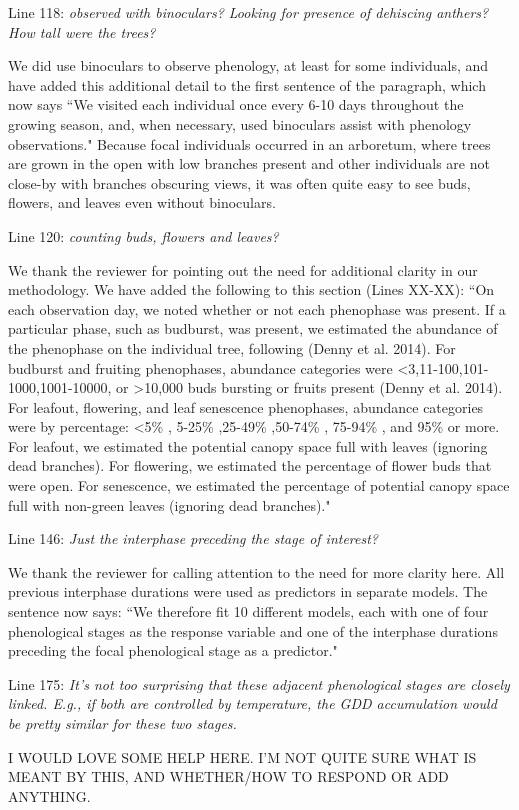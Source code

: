\documentclass[10.95pt,a4paper]{letter}
\begin{document}
\par Line 118: \emph{observed with binoculars?  Looking for presence of dehiscing anthers? How tall were the trees?}

\par We did use binoculars to observe phenology, at least for some individuals, and have added this additional detail to the first sentence  of the paragraph, which now says  ``We visited each individual once every 6-10 days throughout the growing season, and, when necessary, used binoculars assist with phenology observations." Because focal individuals occurred in an arboretum, where trees are grown in the open with low branches present and other individuals are not close-by with branches obscuring views,  it was often quite easy to see buds, flowers, and leaves even without binoculars. 

\par Line 120: \emph{counting buds, flowers and leaves?}

\par We thank the reviewer for pointing out the need for additional clarity in our methodology. We have added the following to this section (Lines XX-XX): ``On each observation day, we noted whether or not each phenophase was present. If a particular phase, such as budburst, was present, we estimated the abundance of the phenophase on the individual tree, following (Denny et al. 2014). For budburst and fruiting phenophases, abundance categories were \textless 3,11-100,101-1000,1001-10000, or \textgreater10,000 buds bursting or fruits present (Denny et al. 2014). For leafout, flowering, and leaf senescence phenophases, abundance categories were by percentage: \textless 5\% , 5-25\% ,25-49\% ,50-74\% , 75-94\% , and 95\%  or more. For leafout, we estimated the potential canopy space full with leaves (ignoring dead branches). For flowering, we estimated the percentage of flower buds that were open. For senescence, we estimated the percentage of potential canopy space full with non-green leaves (ignoring dead branches)." 

\par Line 146:  \emph{Just the interphase preceding the stage of interest?}
\par We thank the reviewer for calling attention to the need for more clarity here. All previous interphase durations were used as predictors in separate models. The sentence now says:
``We therefore fit 10 different models, each with one of four phenological stages as the response variable and one of the interphase durations preceding the focal phenological stage as a predictor."
\par Line 175: \emph{It's not too surprising that these adjacent phenological stages are closely linked. E.g.,  if both are controlled by temperature, the GDD accumulation would be pretty similar for these two stages.} 
\par I WOULD LOVE SOME HELP HERE. I'M NOT QUITE SURE WHAT IS MEANT BY THIS, AND WHETHER/HOW TO RESPOND OR ADD ANYTHING.
\end{document}
